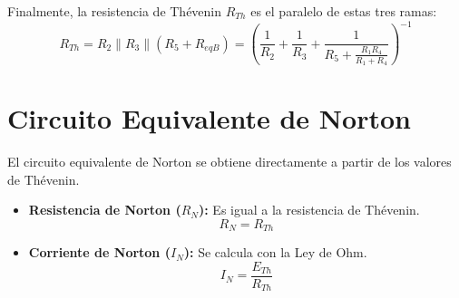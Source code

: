 \documentclass[12pt,a4paper]{article}
\begin{document}
Finalmente, la resistencia de Thévenin $R_{Th}$ es el paralelo de estas tres ramas:
\begin{equation}
    R_{Th} = R_2 \parallel R_3 \parallel (R_5 + R_{eqB}) = \left( \frac{1}{R_2} + \frac{1}{R_3} + \frac{1}{R_5 + \frac{R_1 R_4}{R_1 + R_4}} \right)^{-1}
\end{equation}

\section{Circuito Equivalente de Norton}

El circuito equivalente de Norton se obtiene directamente a partir de los valores de Thévenin.
\begin{itemize}
    \item \textbf{Resistencia de Norton ($R_N$):} Es igual a la resistencia de Thévenin.
    \begin{equation}
        R_N = R_{Th}
    \end{equation}
    \item \textbf{Corriente de Norton ($I_N$):} Se calcula con la Ley de Ohm.
    \begin{equation}
        I_N = \frac{E_{Th}}{R_{Th}}
    \end{equation}
\end{itemize}
\end{document}

